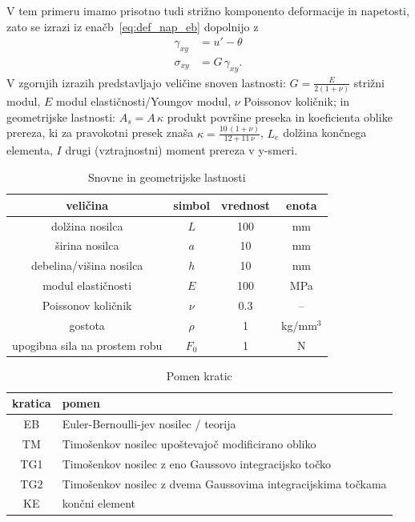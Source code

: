 V tem primeru imamo prisotno tudi strižno komponento deformacije in napetosti, zato se izrazi iz enačb~\ref{eq:def_nap_eb} dopolnijo z
\begin{align}\label{eq:def_nap_timo}
    \gamma_{xy} &= u' - \theta \\\nonumber
    \sigma_{xy} &= G\,\gamma_{xy}.
\end{align}
V zgornjih izrazih predstavljajo veličine snoven lastnosti: $G=\frac{E}{2(1+\nu)}$ strižni modul, $E$ modul elastičnosti/Youngov modul, $\nu$ Poissonov količnik; in geometrijske lastnosti: $A_s=A\,\kappa$ produkt površine preseka in koeficienta oblike prereza, ki za pravokotni presek znaša $\kappa = \frac{10\,(1+\nu)}{12+11\,\nu} $, $L_e$ dolžina končnega elementa, $I$ drugi (vztrajnostni) moment prereza v y-smeri.

\begin{table}[H]
    \centering
    \caption{Snovne in geometrijske lastnosti}
    \label{tab:lastnosti}
    \begin{tabular}{c|c|c|c}
        veličina & simbol & vrednost & enota \\\hline
        dolžina nosilca & $L$ & 100 & mm \\
        širina nosilca & $a$ & 10 & mm \\
        debelina/višina nosilca & $h$ & 10 & mm \\
        modul elastičnosti & $E$ & 100 & MPa \\
        Poissonov količnik & $\nu$ & 0.3 & -- \\
        gostota & $\rho$ & 1 & kg/mm$^3$ \\
        upogibna sila na prostem robu & $F_0$ & 1 & N \\
    \end{tabular}
\end{table}

\begin{table}[H]
    \centering
    \caption{Pomen kratic}
    \label{tab:oznake}
    \begin{tabular}{c|l}
        kratica & pomen \\\hline
        EB & Euler-Bernoulli-jev nosilec / teorija \\
        TM & Timošenkov nosilec upoštevajoč modificirano obliko \\
        TG1 & Timošenkov nosilec z eno Gaussovo integracijsko točko \\
        TG2 & Timošenkov nosilec z dvema Gaussovima integracijskima točkama \\
        KE & končni element \\
    \end{tabular}
\end{table}

